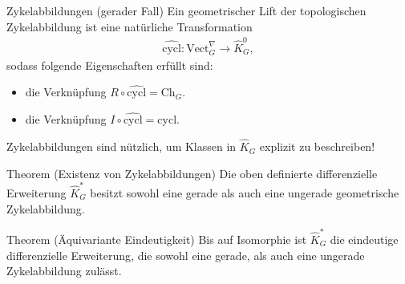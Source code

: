 \documentclass[12pt,utf8,notheorems,compress,t]{beamer}
\renewcommand{\_}{\mathpunct{.}}
\newcommand{\?}{\,{:}\,}
\begin{document}
\begin{frame}{Zykelabbildungen (gerader Fall)}
    Ein geometrischer Lift der topologischen Zykelabbildung ist eine natürliche
    Transformation
    \begin{align*}
        \widehat{\mathrm{cycl}}\colon \mathrm{Vect}^{\nabla}_G\to \hat K_G^0,
    \end{align*}
    sodass folgende Eigenschaften erfüllt sind:
    \begin{itemize}
        \item<2-> die Verknüpfung $R\circ \widehat{\mathrm{cycl}} =
            \mathrm{Ch}_G$.
        \item<2-> die Verknüpfung $I\circ \widehat{\mathrm{cycl}} =
            \mathrm{cycl}$.
    \end{itemize}
\end{frame}
\begin{frame}
    Zykelabbildungen sind nützlich, um Klassen in $\hat K_G$ explizit zu
    beschreiben!
    \begin{block}{Theorem (Existenz von Zykelabbildungen)}
            Die oben definierte differenzielle Erweiterung $\hat K_G^*$ besitzt
            sowohl eine gerade als auch eine ungerade geometrische Zykelabbildung.
    \end{block}
    \begin{block}{Theorem (Äquivariante Eindeutigkeit)}
        Bis auf Isomorphie ist $\hat K_G^*$ die eindeutige differenzielle
        Erweiterung, die sowohl eine gerade, als auch eine ungerade
        Zykelabbildung zulässt. 
    \end{block}
\end{frame}
\end{document}
